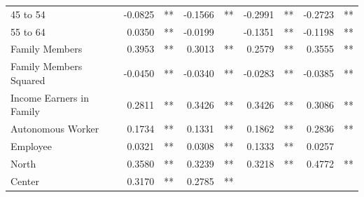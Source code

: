 \documentclass[12pt]{article}
\begin{document}
\begin{table}[!h]
\begin{tabular}{lllllllll}
\multicolumn{1}{l}{45 to 54} &
  \multicolumn{1}{r}{-0.0825} &
  \multicolumn{1}{l}{**} &
  \multicolumn{1}{r}{-0.1566} &
  \multicolumn{1}{l}{**} &
  \multicolumn{1}{r}{-0.2991} &
  \multicolumn{1}{l}{**} &
  \multicolumn{1}{r}{-0.2723} &
  \multicolumn{1}{l}{**} \\
\multicolumn{1}{l}{55 to 64} &
  \multicolumn{1}{r}{0.0350} &
  \multicolumn{1}{l}{**} &
  \multicolumn{1}{r}{-0.0199} &
  \multicolumn{1}{l}{} &
  \multicolumn{1}{r}{-0.1351} &
  \multicolumn{1}{l}{**} &
  \multicolumn{1}{r}{-0.1198} &
  \multicolumn{1}{l}{**} \\
\multicolumn{1}{l}{Family Members} &
  \multicolumn{1}{r}{0.3953} &
  \multicolumn{1}{l}{**} &
  \multicolumn{1}{r}{0.3013} &
  \multicolumn{1}{l}{**} &
  \multicolumn{1}{r}{0.2579} &
  \multicolumn{1}{l}{**} &
  \multicolumn{1}{r}{0.3555} &
  \multicolumn{1}{l}{**} \\
\multicolumn{1}{l}{Family Members Squared} &
  \multicolumn{1}{r}{-0.0450} &
  \multicolumn{1}{l}{**} &
  \multicolumn{1}{r}{-0.0340} &
  \multicolumn{1}{l}{**} &
  \multicolumn{1}{r}{-0.0283} &
  \multicolumn{1}{l}{**} &
  \multicolumn{1}{r}{-0.0385} &
  \multicolumn{1}{l}{**} \\
\multicolumn{1}{l}{Income Earners in Family} &
  \multicolumn{1}{r}{0.2811} &
  \multicolumn{1}{l}{**} &
  \multicolumn{1}{r}{0.3426} &
  \multicolumn{1}{l}{**} &
  \multicolumn{1}{r}{0.3426} &
  \multicolumn{1}{l}{**} &
  \multicolumn{1}{r}{0.3086} &
  \multicolumn{1}{l}{**} \\
\multicolumn{1}{l}{Autonomous Worker} &
  \multicolumn{1}{r}{0.1734} &
  \multicolumn{1}{l}{**} &
  \multicolumn{1}{r}{0.1331} &
  \multicolumn{1}{l}{**} &
  \multicolumn{1}{r}{0.1862} &
  \multicolumn{1}{l}{**} &
  \multicolumn{1}{r}{0.2836} &
  \multicolumn{1}{l}{**} \\
\multicolumn{1}{l}{Employee} &
  \multicolumn{1}{r}{0.0321} &
  \multicolumn{1}{l}{**} &
  \multicolumn{1}{r}{0.0308} &
  \multicolumn{1}{l}{**} &
  \multicolumn{1}{r}{0.1333} &
  \multicolumn{1}{l}{**} &
  \multicolumn{1}{r}{0.0257} &
  \multicolumn{1}{l}{} \\
\multicolumn{1}{l}{North} &
  \multicolumn{1}{r}{0.3580} &
  \multicolumn{1}{l}{**} &
  \multicolumn{1}{r}{0.3239} &
  \multicolumn{1}{l}{**} &
  \multicolumn{1}{r}{0.3218} &
  \multicolumn{1}{l}{**} &
  \multicolumn{1}{r}{0.4772} &
  \multicolumn{1}{l}{**} \\
\multicolumn{1}{l}{Center} &
  \multicolumn{1}{r}{0.3170} &
  \multicolumn{1}{l}{**} &
  \multicolumn{1}{r}{0.2785} &
  \multicolumn{1}{l}{**} &

\end{tabular}
\end{table}
\end{document}
